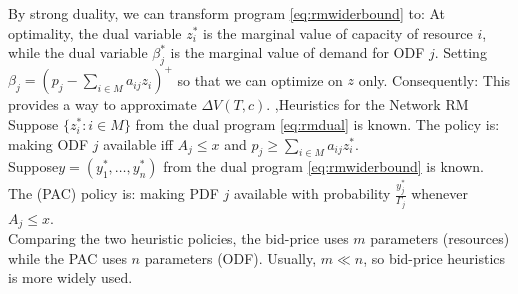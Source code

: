 \documentclass[10pt]{report}
\begin{document}
By strong duality, we can transform program \ref{eq:rmwiderbound} to:
At optimality, the dual variable $z_i^*$ is the marginal value of capacity of resource $i$,
while the dual variable $\beta_j^*$ is the marginal value of demand for ODF $j$. Setting $\beta_j=(p_j-\sum_{i\in M}a_{ij}z_i)^+$ so that
we can optimize on $z$ only. Consequently:
This provides a way to approximate $\Delta V(T,c)$.
\sep{Heuristics for the Network RM}
Suppose $\{z_i^*:i\in M\}$ from the dual program \ref{eq:rmdual} is known. The  policy is: making ODF $j$ available iff
$A_j\le x$ and $p_j \ge \sum_{i\in M}a_{ij}z_i^*$.\\
Suppose$y=(y_1^*,\ldots,y_n^*)$ from the dual program \ref{eq:rmwiderbound} is known. The  (PAC) policy is: making PDF $j$ available with
probability $\frac{y_j^*}{\Gamma_j}$ whenever $A_j\le x$.\\
Comparing the two heuristic policies, the bid-price uses $m$ parameters (resources) while the PAC uses $n$ parameters (ODF). Usually, $m\ll n$, so bid-price heuristics is more widely used.
\end{document}
